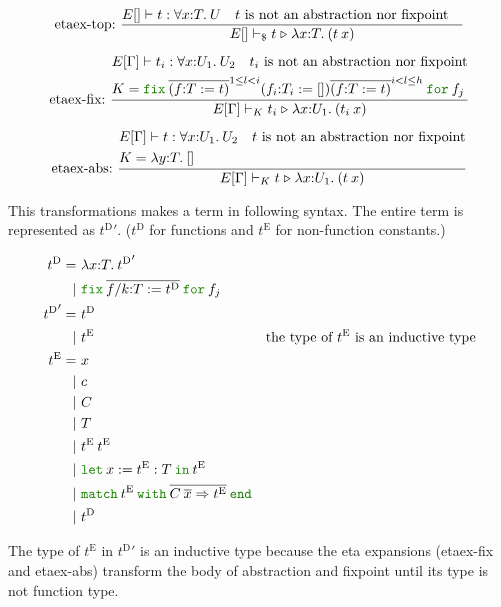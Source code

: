 \documentclass[a4paper,fleqn]{article}
\newcommand{\kwlet}{\mbox{\color{mygreen}\ttfamily let}}
\newcommand{\kwin}{\mbox{\color{mygreen}\ttfamily in}}
\newcommand{\kwmatch}{\mbox{\color{mygreen}\ttfamily match}}
\newcommand{\kwwith}{\mbox{\color{mygreen}\ttfamily with}}
\newcommand{\kwend}{\mbox{\color{mygreen}\ttfamily end}}
\newcommand{\kwfix}{\mbox{\color{mygreen}\ttfamily fix}}
\newcommand{\kwfor}{\mbox{\color{mygreen}\ttfamily for}}
\newcommand{\lamT}[3]{\lambda #1\mathord{:}#2.\:#3}
\newcommand{\prodT}[3]{\forall #1\mathord{:}#2.\:#3}
\newcommand{\letin}[3]{\kwlet\:#1:=#2\:\kwin\:#3}
\newcommand{\omatch}[2]{\kwmatch\:#1\:\kwwith\:{#2}\:\kwend}
\newcommand{\ofix}[2]{\kwfix\:{#1}\:\kwfor\:{#2}}
\newcommand{\tD}{{t^\mathrm{D}}}
\newcommand{\tE}{{t^\mathrm{E}}}
\newcommand{\breakrule}{\\[0.5em]}
\newcommand{\reltri}{\mathrel{\triangleright}}
\newcommand{\repi}[2]{\overline{#1}^{#2}}
\begin{document}
\begin{gather*}
  \text{etaex-top:}~
    \dfrac{
      E[] \vdash t : \prodT{x}{T}{U} \quad
      \text{$t$ is not an abstraction nor fixpoint} \quad
    }{
      E[] \vdash_\$ t \reltri \lamT{x}{T}{(t\:x)}
    } \breakrule
  \text{etaex-fix:}~
    \dfrac{
      \begin{aligned}
        & E[\Gamma] \vdash t_i : \prodT{x}{U_1}{U_2} \quad
          \text{$t_i$ is not an abstraction nor fixpoint} \\
        & K = \ofix{\repi{(f{:}T:=t)}{1\leq l < i} (f_i{:}T_i:=[]) \repi{(f{:}T:=t)}{i < l \leq h}}{f_j}
      \end{aligned}
    }{
        E[\Gamma] \vdash_K t_i \reltri \lamT{x}{U_1}{(t_i\:x)}
    } \breakrule
  \text{etaex-abs:}~
    \dfrac{
      \begin{aligned}
        & E[\Gamma] \vdash t : \prodT{x}{U_1}{U_2} \quad
          \text{$t$ is not an abstraction nor fixpoint} \\
        & K = \lamT{y}{T}{[]}
      \end{aligned}
    }{
      E[\Gamma] \vdash_K t \reltri \lamT{x}{U_1}{(t\:x)}
    }
\end{gather*}

This transformations makes a term in following syntax.
The entire term is represented as $\tD'$.
($\tD$ for functions and $\tE$ for non-function constants.)

\begin{align*}
  \tD =&\ \lamT{x}{T}{\tD'} \\
      |&\ \ofix{\overline{f/k{:}T:=\tD}}{f_j} \\
  \tD' =&\ \tD \\
       |&\ \tE & \text{the type of $\tE$ is an inductive type} \\
  \tE =&\ x \\
    |&\ c \\
    |&\ C \\
    |&\ T \\
    |&\ \tE\:\tE \\
    |&\ \letin{x}{\tE:T}{\tE} \\
    |&\ \omatch{\tE}{\overline{C\:\overline{x}\Rightarrow \tE}} \\
    |&\ \tD \\
\end{align*}

The type of $\tE$ in $\tD'$ is an inductive type because
the eta expansions (etaex-fix and etaex-abs) transform the body of abstraction and fixpoint until its type is not function type.
\end{document}
